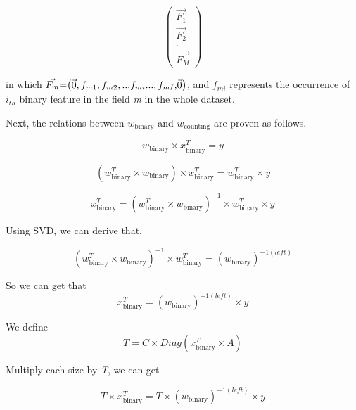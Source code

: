 \documentclass{sig-alternate}
\begin{document}
$$
\begin{pmatrix} 
\vec{F_1} \\
\vec{F_2} \\
.\\
\vec{F_M}

\end{pmatrix}
$$

\noindent in which \($$\vec{F_m}$$ = $$\begin{pmatrix} 
$$\vec{0 }$$ , f_{m1}, f_{m2}, ...f_{mi}... , f_{mI} ,$$\vec{0 }$$ 
\end{pmatrix}$$\), and \(f_{mi}\) represents the occurrence of \(i_{th}\) binary feature in the field \textsl{m} in the whole dataset.\vspace{5mm}

\noindent Next, the relations between \(w_{\text{binary}}\) and \(w_{\text{counting}}\) are proven as follows. 

\begin{equation}
w_{\text{binary}} \times x_{\text{binary}}^T = y 
\end{equation}

\begin{equation}
(w_{\text{binary}}^T \times w_{\text{binary}}) \times x_{\text{binary}}^T = w_{\text{binary}}^T \times y 
\end{equation}

\begin{equation}
x_{\text{binary}}^T = (w_{\text{binary}}^T \times w_{\text{binary}})^{-1} \times w_{\text{binary}}^T \times y 
\end{equation}

Using SVD, we can derive that,

\begin{equation}
(w_{\text{binary}}^T \times w_{\text{binary}})^{-1} \times w_{\text{binary}}^T = (w_{\text{binary}})^{-1(left)}  
\end{equation}

So we can get that 
\begin{equation}
x_{\text{binary}}^T =  (w_{\text{binary}})^{-1(left)} \times y 
\end{equation}

We define
\begin{equation}
T = C \times Diag(x_{\text{binary}}^T \times A)
\end{equation}


Multiply each size by \textsl{T}, we can get
 
\begin{equation}
T \times x_{\text{binary}}^T =  T \times (w_{\text{binary}})^{-1(left)} \times y 
\end{equation}
\end{document}

